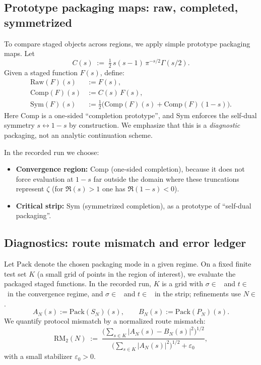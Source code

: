 \subsection{Prototype packaging maps: raw, completed, symmetrized}
To compare staged objects across regions, we apply simple prototype packaging maps.
Let
\[
C(s)\;:=\;\tfrac12\,s(s-1)\,\pi^{-s/2}\Gamma(s/2).
\]
Given a staged function $F(s)$, define:
\begin{align*}
\mathrm{Raw}(F)(s) &:= F(s),
\\
\mathrm{Comp}(F)(s) &:= C(s)\,F(s),
\\
\mathrm{Sym}(F)(s) &:= \tfrac12\bigl(\mathrm{Comp}(F)(s)+\mathrm{Comp}(F)(1-s)\bigr).
\end{align*}
Here $\mathrm{Comp}$ is a one-sided ``completion prototype'', and $\mathrm{Sym}$ enforces the self-dual symmetry $s\leftrightarrow 1-s$ by construction.
We emphasize that this is a \emph{diagnostic} packaging, not an analytic continuation scheme.

In the recorded run we choose:
\begin{itemize}
  \item \textbf{Convergence region:} $\mathrm{Comp}$ (one-sided completion), because it does not force evaluation at $1-s$ far outside the domain where these truncations represent $\zeta$ (for $\Re(s)>1$ one has $\Re(1-s)<0$).
  \item \textbf{Critical strip:} $\mathrm{Sym}$ (symmetrized completion), as a prototype of ``self-dual packaging''.
\end{itemize}

\subsection{Diagnostics: route mismatch and error ledger}
Let $\mathrm{Pack}$ denote the chosen packaging mode in a given regime.
On a fixed finite test set $K$ (a small grid of points in the region of interest), we evaluate the packaged staged functions.
In the recorded run, $K$ is a grid with $\sigma\in$ \PrimeSigmaConvList\ and $t\in$ \PrimeTList\ in the convergence regime, and $\sigma\in$ \PrimeSigmaStripList\ and $t\in$ \PrimeTList\ in the strip; refinements use $N\in$ \PrimeNList.
\[
A_N(s):=\mathrm{Pack}(S_N)(s),
\qquad
B_N(s):=\mathrm{Pack}(P_N)(s).
\]
We quantify protocol mismatch by a normalized route mismatch:
\[
\mathrm{RM}_2(N)
\;:=\;
\frac{\bigl(\sum_{s\in K}|A_N(s)-B_N(s)|^2\bigr)^{1/2}}
     {\bigl(\sum_{s\in K}|A_N(s)|^2\bigr)^{1/2}+\varepsilon_0},
\]
with a small stabilizer $\varepsilon_0>0$.

